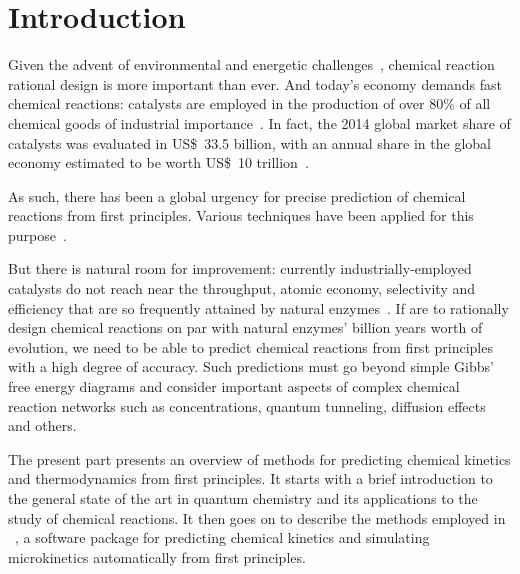 \chapter{Introduction}%
\label{ch:introduction}

Given the advent of environmental and energetic challenges~\cite{Bertozzi_2016},
chemical reaction rational design is more important than ever.
And today's economy demands fast chemical reactions:
catalysts are employed in the production of over 80\% of all chemical
goods of industrial
importance~\cite{Breakthrough_Catalyst,GlobalCatalystMarket}.
In fact, the 2014 global market share of catalysts was evaluated in US\$~33.5 billion,
with an annual share in the global economy estimated to be worth US\$~10
trillion~\cite{GlobalCatalystMarket}.

As such, there has been a global urgency for precise prediction of chemical reactions from first principles.
Various techniques have been applied for this purpose~\cite{Cao2022}.

But there is natural room for improvement:
currently industrially-employed catalysts do
not reach near the throughput, atomic economy, selectivity and efficiency that
are so frequently attained by natural
enzymes~\cite{Catalysis_in_Chemistry_and_Enzymology}.
If are to rationally design chemical reactions on par with natural enzymes' billion years worth of evolution,
we need to be able to predict chemical reactions from first principles with a
high degree of accuracy.
Such predictions must go beyond simple Gibbs' free energy
diagrams and consider important aspects of complex chemical reaction networks
such as concentrations, quantum tunneling, diffusion effects and others.

The present part presents an overview of methods for predicting chemical
kinetics and thermodynamics from first principles.
It starts with a brief introduction to the general state of the art in quantum
chemistry and its applications to the study of chemical reactions.
It then goes on to describe the methods employed in
\overreact~\cite{Schneider2022}, a software
package for predicting chemical kinetics and simulating microkinetics
automatically from first principles.

